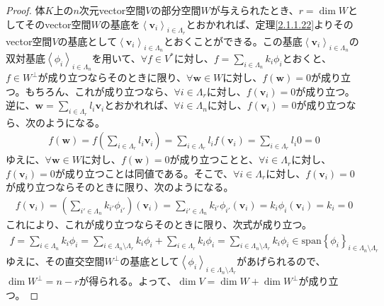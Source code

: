 \documentclass[dvipdfmx]{jsarticle}
\begin{document}
\begin{proof}
体$K$上の$n$次元vector空間$V$の部分空間$W$が与えられたとき、$r = \dim W$としてそのvector空間$W$の基底を$\left\langle \mathbf{v}_{i} \right\rangle_{i \in \varLambda_{r}}$とおかれれば、定理\ref{2.1.1.22}よりそのvector空間$V$の基底として$\left\langle \mathbf{v}_{i} \right\rangle_{i \in \varLambda_{n}}$とおくことができる。この基底$\left\langle \mathbf{v}_{i} \right\rangle_{i \in \varLambda_{n}}$の双対基底$\left\langle \phi_{i} \right\rangle_{i \in \varLambda_{n}}$を用いて、$\forall f \in V^{*}$に対し、$f = \sum_{i \in \varLambda_{n}} {k_{i}\phi_{i}}$とおくと、$f \in W^{\bot}$が成り立つならそのときに限り、$\forall\mathbf{w} \in W$に対し、$f\left( \mathbf{w} \right) = 0$が成り立つ。もちろん、これが成り立つなら、$\forall i \in \varLambda_{r}$に対し、$f\left( \mathbf{v}_{i} \right) = 0$が成り立つ。逆に、$\mathbf{w} = \sum_{i \in \varLambda_{r}} {l_{i}\mathbf{v}_{i}}$とおかれれば、$\forall i \in \varLambda_{n}$に対し、$f\left( \mathbf{v}_{i} \right) = 0$が成り立つなら、次のようになる。
\begin{align*}
f\left( \mathbf{w} \right) = f\left( \sum_{i \in \varLambda_{r}} {l_{i}\mathbf{v}_{i}} \right) = \sum_{i \in \varLambda_{r}} {l_{i}f\left( \mathbf{v}_{i} \right)} = \sum_{i \in \varLambda_{r}} {l_{i}0} = 0
\end{align*}
ゆえに、$\forall\mathbf{w} \in W$に対し、$f\left( \mathbf{w} \right) = 0$が成り立つことと、$\forall i \in \varLambda_{r}$に対し、$f\left( \mathbf{v}_{i} \right) = 0$が成り立つことは同値である。そこで、$\forall i \in \varLambda_{r}$に対し、$f\left( \mathbf{v}_{i} \right) = 0$が成り立つならそのときに限り、次のようになる。
\begin{align*}
f\left( \mathbf{v}_{i} \right) = \left( \sum_{i' \in \varLambda_{n}} {k_{i'}\phi_{i'}} \right)\left( \mathbf{v}_{i} \right) = \sum_{i' \in \varLambda_{n}} {k_{i'}\phi_{i'}\left( \mathbf{v}_{i} \right)} = k_{i}\phi_{i}\left( \mathbf{v}_{i} \right) = k_{i} = 0
\end{align*}
これにより、これが成り立つならそのときに限り、次式が成り立つ。
\begin{align*}
f = \sum_{i \in \varLambda_{n}} {k_{i}\phi_{i}} = \sum_{i \in \varLambda_{n} \setminus \varLambda_{r}} {k_{i}\phi_{i}} + \sum_{i \in \varLambda_{r}} {k_{i}\phi_{i}} = \sum_{i \in \varLambda_{n} \setminus \varLambda_{r}} {k_{i}\phi_{i}} \in \mathrm{span}\left\{ \phi_{i} \right\}_{i \in \varLambda_{n} \setminus \varLambda_{r}}
\end{align*}
ゆえに、その直交空間$W^{\bot}$の基底として$\left\langle \phi_{i} \right\rangle_{i \in \varLambda_{n} \setminus \varLambda_{r}}$があげられるので、$\dim W^{\bot} = n - r$が得られる。よって、$\dim V = \dim W + \dim W^{\bot}$が成り立つ。
\end{proof}
\end{document}
